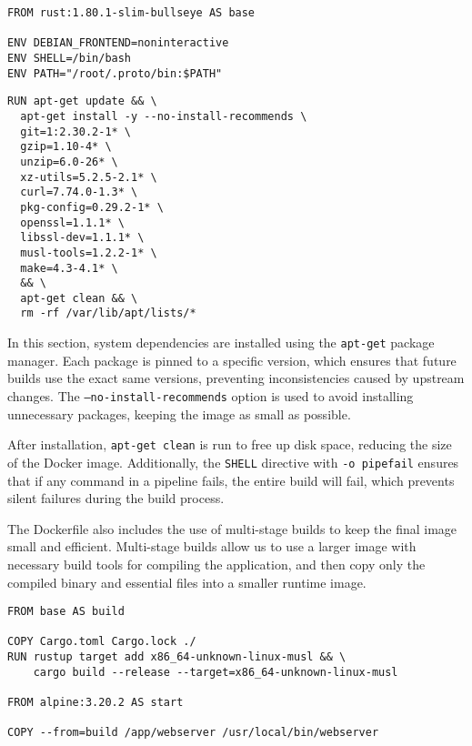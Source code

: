 \begin{lstlisting}[caption={Base Image and Environment Setup}]
FROM rust:1.80.1-slim-bullseye AS base

ENV DEBIAN_FRONTEND=noninteractive
ENV SHELL=/bin/bash
ENV PATH="/root/.proto/bin:$PATH"
\end{lstlisting}

\begin{lstlisting}[caption={Installing Dependencies in Docker}]
RUN apt-get update && \
  apt-get install -y --no-install-recommends \
  git=1:2.30.2-1* \
  gzip=1.10-4* \
  unzip=6.0-26* \
  xz-utils=5.2.5-2.1* \
  curl=7.74.0-1.3* \
  pkg-config=0.29.2-1* \
  openssl=1.1.1* \
  libssl-dev=1.1.1* \
  musl-tools=1.2.2-1* \
  make=4.3-4.1* \
  && \
  apt-get clean && \
  rm -rf /var/lib/apt/lists/*
\end{lstlisting}

In this section, system dependencies are installed using the \texttt{apt-get} package
manager. Each package is pinned to a specific version, which ensures that future builds
use the exact same versions, preventing inconsistencies caused by upstream changes.
The \texttt{--no-install-recommends} option is used to avoid installing unnecessary
packages, keeping the image as small as possible.

After installation, \texttt{apt-get clean} is run to free up disk space,
reducing the size of the Docker image. Additionally,
the \texttt{SHELL} directive with \texttt{-o pipefail} ensures that if any command in
a pipeline fails, the entire build will fail, which prevents silent failures during
the build process.

The Dockerfile also includes the use of multi-stage builds to keep the final image
small and efficient. Multi-stage builds allow us to use a larger image with necessary
build tools for compiling the application, and then copy only the compiled binary and
essential files into a smaller runtime image.

\begin{lstlisting}[caption={Multi-Stage Build Setup}]
FROM base AS build

COPY Cargo.toml Cargo.lock ./
RUN rustup target add x86_64-unknown-linux-musl && \
    cargo build --release --target=x86_64-unknown-linux-musl

FROM alpine:3.20.2 AS start

COPY --from=build /app/webserver /usr/local/bin/webserver
\end{lstlisting}

